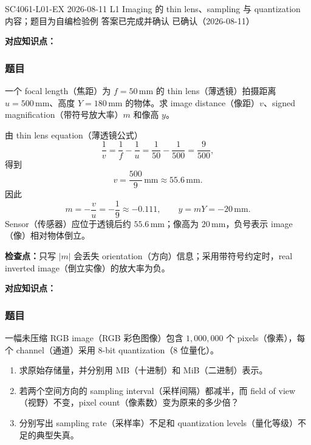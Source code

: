 

\examplemeta
  {SC4061-L01-EX}
  {2026-08-11}
  {L1 Imaging 的 thin lens、sampling 与 quantization 内容；题目为自编检验例}
  {答案已完成并确认}
  {已确认（2026-08-11）}


\textbf{对应知识点：}

\subsubsection*{题目}

一个 focal length（焦距）为 $f=50\,\mathrm{mm}$ 的 thin lens（薄透镜）拍摄距离 $u=500\,\mathrm{mm}$、高度 $Y=180\,\mathrm{mm}$ 的物体。求 image distance（像距）$v$、signed magnification（带符号放大率）$m$ 和像高 $y$。

\begin{workedsolution}
由 thin lens equation（薄透镜公式）
\[
  \frac{1}{v}=\frac{1}{f}-\frac{1}{u}
  =\frac{1}{50}-\frac{1}{500}
  =\frac{9}{500},
\]
得到
\[
  v=\frac{500}{9}\,\mathrm{mm}\approx55.6\,\mathrm{mm}.
\]
因此
\[
  m=-\frac{v}{u}=-\frac{1}{9}\approx-0.111,
  \qquad
  y=mY=-20\,\mathrm{mm}.
\]
Sensor（传感器）应位于透镜后约 $55.6\,\mathrm{mm}$；像高为 $20\,\mathrm{mm}$，负号表示 image（像）相对物体倒立。
\end{workedsolution}

\textbf{检查点：}只写 $|m|$ 会丢失 orientation（方向）信息；采用带符号约定时，real inverted image（倒立实像）的放大率为负。


\textbf{对应知识点：}

\subsubsection*{题目}

一幅未压缩 RGB image（RGB 彩色图像）包含 $1{,}000{,}000$ 个 pixels（像素），每个 channel（通道）采用 8-bit quantization（8 位量化）。

\begin{enumerate}[label=(\alph*)]
  \item 求原始存储量，并分别用 MB（十进制）和 MiB（二进制）表示。
  \item 若两个空间方向的 sampling interval（采样间隔）都减半，而 field of view（视野）不变，pixel count（像素数）变为原来的多少倍？
  \item 分别写出 sampling rate（采样率）不足和 quantization levels（量化等级）不足的典型失真。
\end{enumerate}

